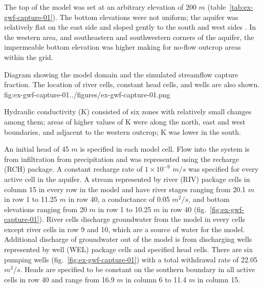 The top of the model was set at an arbitrary elevation of 200 $m$ (table~\ref{tab:ex-gwf-capture-01}). The bottom elevations were not uniform; the aquifer was relatively flat on the east side and sloped gently to the south and west sides \citep[see][fig.~1b]{hunt2020revisiting}. In the western area, and southeastern and southwestern corners of the aquifer, the impermeable bottom elevation was higher making for no-flow outcrop areas within the grid. 


\begin{StandardFigure}{
                                     Diagram showing the model domain and the simulated streamflow capture fraction. The location of river cells, constant head cells, and wells are also shown.
                                     }{fig:ex-gwf-capture-01}{../figures/ex-gwf-capture-01.png}
\end{StandardFigure}                                 





Hydraulic conductivity (K) consisted of six zones  \citep[see][fig.~1c]{hunt2020revisiting} with relatively small changes among them; areas of higher values of K were along the north, east and west boundaries, and adjacent to the western outcrop; K was lower in the south.

An initial head of 45 $m$ is specified in each model cell. Flow into the system is from infiltration from precipitation and was represented using the recharge (RCH) package. A constant recharge rate of $1 \times 10^{-9}$ $m/s$ was specified for every active cell in the aquifer. A stream represented by river (RIV) package cells in column 15 in every row in the model and have river stages ranging from 20.1 $m$ in row 1 to 11.25 $m$ in row 40, a conductance of 0.05 $m^2/s$, and bottom elevations ranging from 20 $m$ in row 1 to 10.25 $m$ in row 40 (fig.~\ref{fig:ex-gwf-capture-01}). River cells discharge groundwater from the model in every cells except river cells in row 9 and 10, which are a source of water for the model. Additional discharge of groundwater out of the model is from discharging wells represented by well (WEL) package cells and specified head cells. There are six pumping wells (fig.~\ref{fig:ex-gwf-capture-01}) with a total withdrawal rate of 22.05 $m^3/s$. Heads are specified to be constant on the southern boundary in all active cells in row 40 and range from 16.9 $m$ in column 6 to 11.4 $m$ in column 15.

